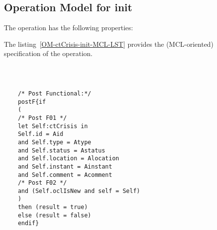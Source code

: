 \subsection{Operation Model for init}

\label{OM-init}


The  operation has the following properties:

	\begin{operationmodel}



		


	\end{operationmodel}



	\vspace{1cm}
	The listing~\ref{OM-ctCrisis-init-MCL-LST} provides the \msrmessir (MCL-oriented) specification of the operation.
	
	\scriptsize
	\vspace{0.5cm}
	\begin{lstlisting}[style=MessirStyle,firstnumber=auto,captionpos=b,caption={\msrmessir (MCL-oriented) specification of the operation \emph{init}.},label=OM-ctCrisis-init-MCL-LST]

	
	
	/* Post Functional:*/ 
	postF{if
	(
	/* Post F01 */
	let Self:ctCrisis in
	Self.id = Aid
	and Self.type = Atype
	and Self.status = Astatus
	and Self.location = Alocation
	and Self.instant = Ainstant
	and Self.comment = Acomment
	/* Post F02 */
	and (Self.oclIsNew and self = Self)
	)
	then (result = true)
	else (result = false)
	endif}
	
	
	\end{lstlisting}
	\normalsize 
	
